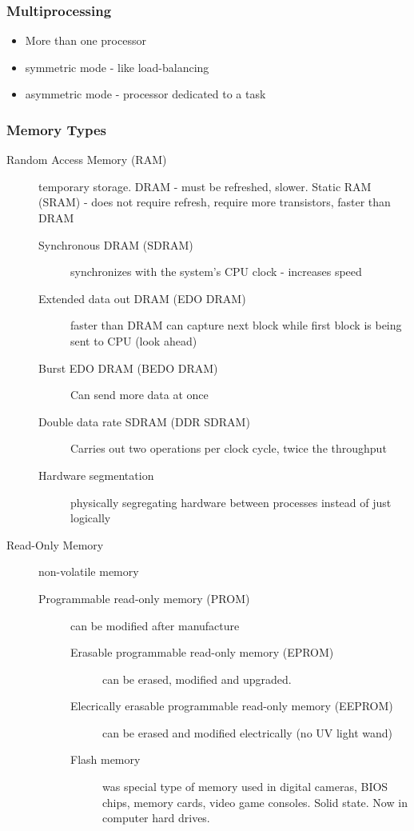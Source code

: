 \documentclass[11pt]{article}
\begin{document}
\subsubsection{Multiprocessing}
\label{sec:org36dd428}
\begin{itemize}
\item More than one processor
\item symmetric mode - like load-balancing
\item asymmetric mode - processor dedicated to a task
\end{itemize}
\subsubsection{Memory Types}
\label{sec:org34de66a}
\begin{description}
\item[{Random Access Memory (RAM)}] temporary storage. DRAM - must be refreshed, slower. Static RAM (SRAM) - does not require refresh, require more transistors, faster than DRAM
\begin{description}
\item[{Synchronous DRAM (SDRAM)}] synchronizes with the system's CPU clock - increases speed
\item[{Extended data out DRAM (EDO DRAM)}] faster than DRAM can capture next block while first block is being sent to CPU (look ahead)
\item[{Burst EDO DRAM (BEDO DRAM)}] Can send more data at once
\item[{Double data rate SDRAM (DDR SDRAM)}] Carries out two operations per clock cycle, twice the throughput
\item[{Hardware segmentation}] physically segregating hardware between processes instead of just logically
\end{description}
\item[{Read-Only Memory}] non-volatile memory
\begin{description}
\item[{Programmable read-only memory (PROM)}] can be modified after manufacture
\begin{description}
\item[{Erasable programmable read-only memory (EPROM)}] can be erased, modified and upgraded.
\item[{Elecrically erasable programmable read-only memory (EEPROM)}] can be erased and modified electrically (no UV light wand)
\item[{Flash memory}] was special type of memory used in digital cameras, BIOS chips, memory cards, video game consoles. Solid state. Now in computer hard drives.

\end{description}
\end{description}
\end{description}
\end{document}
